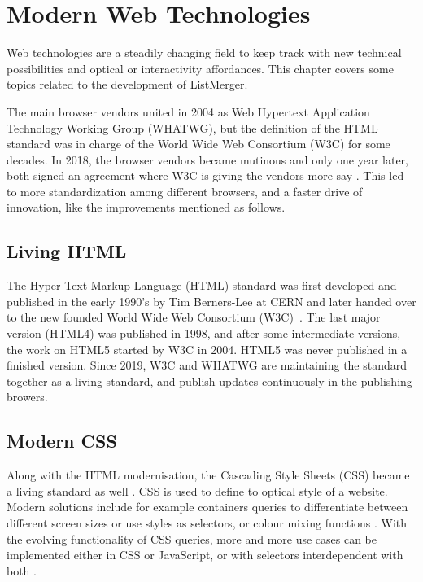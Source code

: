 %
%
% 
% 
% 

\chapter{Modern Web Technologies}
\label{chap:webtech}

Web technologies are a steadily changing field to keep track with new
technical possibilities and optical or interactivity affordances. This
chapter covers some topics related to the development of ListMerger.

The main browser vendors united in 2004 as Web Hypertext
Application Technology Working Group (WHATWG), but the definition of the
HTML standard was in charge of the World Wide Web Consortium (W3C) for
some decades. In 2018, the browser vendors became mutinous and only one
year later, both signed an agreement where W3C is giving the vendors
more say \parencite{cimpanu-whatwg-w3c}. This led to more
standardization among different browsers, and a faster drive of
innovation, like the improvements mentioned as follows.




\section{Living HTML}

The Hyper Text Markup Language (HTML) standard was first developed and
published in the early 1990's by Tim Berners-Lee at CERN and later
handed over to the new founded World Wide Web Consortium
(W3C)~\parencite{whatwg-livingstandard}. The last major version (HTML4)
was published in 1998, and after some intermediate versions, the work on
HTML5 started by W3C in 2004. HTML5 was never published in a finished
version. Since 2019, W3C and WHATWG are maintaining the standard
together as a living standard, and publish updates continuously in the
publishing browers.




\section{Modern CSS}

Along with the HTML modernisation, the Cascading Style Sheets (CSS)
became a living standard as well \parencite{w3c-css}. CSS is used to
define to optical style of a website. Modern solutions include for
example containers queries \parencite{mdn-cssquieries} to differentiate
between different screen sizes or use styles as selectors, or colour
mixing functions \parencite{mdn-colorfunctions}. With the evolving
functionality of CSS queries, more and more use cases can be implemented
either in CSS or JavaScript, or with selectors interdependent with both
\parencite{css-states-js}.




